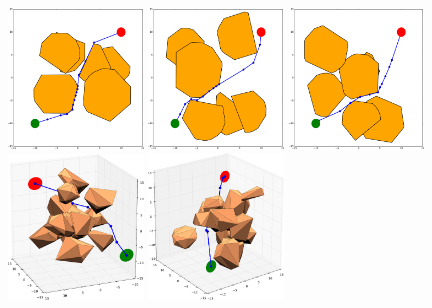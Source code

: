 \documentclass[12pt]{article}
\begin{document}
\begin{figure}[h!]
    \centering
    \includegraphics[width=0.32\textwidth]{2d_example_1.pdf}
    \includegraphics[width=0.32\textwidth]{2d_example_2.pdf}
    \includegraphics[width=0.32\textwidth]{2d_example_3.pdf} \\
    \includegraphics[width=0.32\textwidth]{3d_example_1.pdf}
    \includegraphics[width=0.32\textwidth]{3d_example_2.pdf}

\end{figure}
\end{document}
